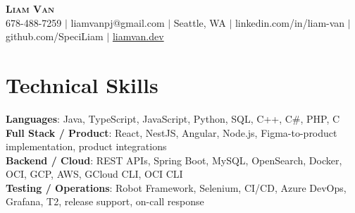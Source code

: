 \documentclass[letterpaper,11pt]{article}
\begin{document}

%
\begin{center}
    \textbf{\Huge \scshape Liam Van} \\ \vspace{1pt}
    \small 678-488-7259 $|$ liamvanpj@gmail.com $|$ Seattle, WA $|$
    linkedin.com/in/liam-van $|$ github.com/SpeciLiam $|$ \href{https://liamvan.dev}{liamvan.dev}

\end{center}

\section{Technical Skills}
 \begin{itemize}[leftmargin=0.15in, label={}]
    \small{\item{
     \textbf{Languages}{: Java, TypeScript, JavaScript, Python, SQL, C++, C\#, PHP, C} \\
     \textbf{Full Stack / Product}{: React, NestJS, Angular, Node.js, Figma-to-product implementation, product integrations} \\
     \textbf{Backend / Cloud}{: REST APIs, Spring Boot, MySQL, OpenSearch, Docker, OCI, GCP, AWS, GCloud CLI, OCI CLI} \\
     \textbf{Testing / Operations}{: Robot Framework, Selenium, CI/CD, Azure DevOps, Grafana, T2, release support, on-call response} \\
    }}
 \end{itemize}
%

\end{document}
